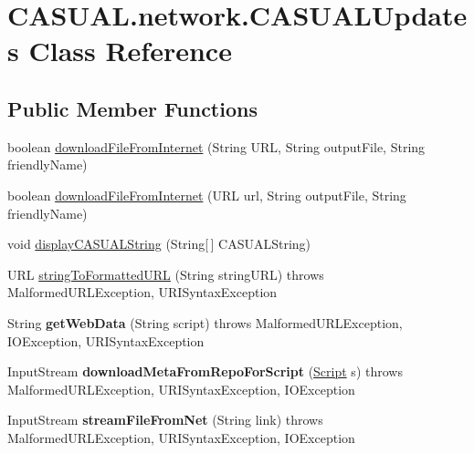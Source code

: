 \hypertarget{classCASUAL_1_1network_1_1CASUALUpdates}{\section{C\-A\-S\-U\-A\-L.\-network.\-C\-A\-S\-U\-A\-L\-Updates Class Reference}
\label{classCASUAL_1_1network_1_1CASUALUpdates}
}
\subsection*{Public Member Functions}
\begin{DoxyCompactItemize}
\item 
boolean \hyperlink{classCASUAL_1_1network_1_1CASUALUpdates_a9bfc14b6130b3d0fd9e4d9fd66674938}{download\-File\-From\-Internet} (String U\-R\-L, String output\-File, String friendly\-Name)
\item 
boolean \hyperlink{classCASUAL_1_1network_1_1CASUALUpdates_a744e587848a05d43eef7aa75e3c30e8b}{download\-File\-From\-Internet} (U\-R\-L url, String output\-File, String friendly\-Name)
\item 
void \hyperlink{classCASUAL_1_1network_1_1CASUALUpdates_a0bb12c8c206be8c0814ad231ad02a104}{display\-C\-A\-S\-U\-A\-L\-String} (String\mbox{[}$\,$\mbox{]} C\-A\-S\-U\-A\-L\-String)
\item 
U\-R\-L \hyperlink{classCASUAL_1_1network_1_1CASUALUpdates_abb67fb934011f1386b09742f475f137c}{string\-To\-Formatted\-U\-R\-L} (String string\-U\-R\-L)  throws Malformed\-U\-R\-L\-Exception, U\-R\-I\-Syntax\-Exception 
\item 
\hypertarget{classCASUAL_1_1network_1_1CASUALUpdates_a9b8929945452d42e11476348eaa0bb91}{String {\bfseries get\-Web\-Data} (String script)  throws Malformed\-U\-R\-L\-Exception, I\-O\-Exception, U\-R\-I\-Syntax\-Exception }\label{classCASUAL_1_1network_1_1CASUALUpdates_a9b8929945452d42e11476348eaa0bb91}

\item 
\hypertarget{classCASUAL_1_1network_1_1CASUALUpdates_a8bc8251abf97e6fb59fe2478d0a34806}{Input\-Stream {\bfseries download\-Meta\-From\-Repo\-For\-Script} (\hyperlink{classCASUAL_1_1caspac_1_1Script}{Script} s)  throws Malformed\-U\-R\-L\-Exception, U\-R\-I\-Syntax\-Exception, I\-O\-Exception }\label{classCASUAL_1_1network_1_1CASUALUpdates_a8bc8251abf97e6fb59fe2478d0a34806}

\item 
\hypertarget{classCASUAL_1_1network_1_1CASUALUpdates_ae40ac8c5ffe9d0b49214bfd9e7169304}{Input\-Stream {\bfseries stream\-File\-From\-Net} (String link)  throws Malformed\-U\-R\-L\-Exception, U\-R\-I\-Syntax\-Exception, I\-O\-Exception }\label{classCASUAL_1_1network_1_1CASUALUpdates_ae40ac8c5ffe9d0b49214bfd9e7169304}


\end{DoxyCompactItemize}
